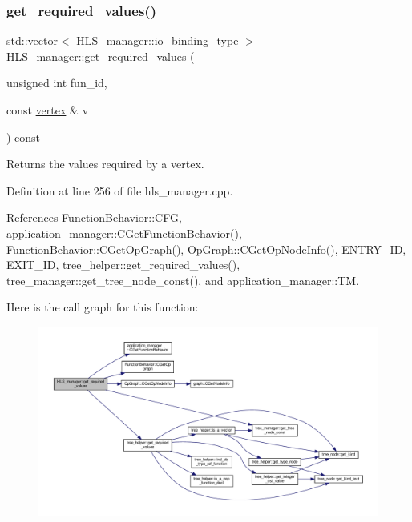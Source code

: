 \subsubsection{\texorpdfstring{get\+\_\+required\+\_\+values()}{get\_required\_values()}}
{\footnotesize\ttfamily std\+::vector$<$ \hyperlink{classHLS__manager_a972627cc658afa992590b9d2bf1a1e87}{H\+L\+S\+\_\+manager\+::io\+\_\+binding\+\_\+type} $>$ H\+L\+S\+\_\+manager\+::get\+\_\+required\+\_\+values (\begin{DoxyParamCaption}\item[{unsigned int}]{fun\+\_\+id,  }\item[{const \hyperlink{graph_8hpp_abefdcf0544e601805af44eca032cca14}{vertex} \&}]{v }\end{DoxyParamCaption}) const}



Returns the values required by a vertex. 



Definition at line 256 of file hls\+\_\+manager.\+cpp.



References Function\+Behavior\+::\+C\+FG, application\+\_\+manager\+::\+C\+Get\+Function\+Behavior(), Function\+Behavior\+::\+C\+Get\+Op\+Graph(), Op\+Graph\+::\+C\+Get\+Op\+Node\+Info(), E\+N\+T\+R\+Y\+\_\+\+ID, E\+X\+I\+T\+\_\+\+ID, tree\+\_\+helper\+::get\+\_\+required\+\_\+values(), tree\+\_\+manager\+::get\+\_\+tree\+\_\+node\+\_\+const(), and application\+\_\+manager\+::\+TM.

Here is the call graph for this function\+:
\nopagebreak
\begin{figure}[H]
\begin{center}
\leavevmode
\includegraphics[width=350pt]{dc/dd7/classHLS__manager_a478b55ce1c14b09a98e3aa266bdde269_cgraph}
\end{center}
\end{figure}
\mbox{\label{classHLS__manager_a86f96e84a4f71c2d6a5edac106fad44d}} 
